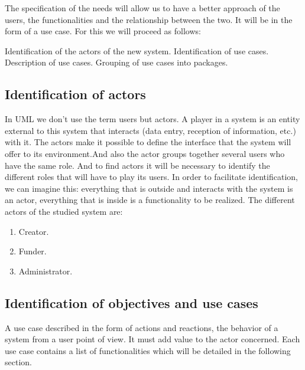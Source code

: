 The specification of the needs will allow us to have a better approach of the users, the functionalities and the relationship between the two. It will be in the form of a use case. For this we will proceed as follows:

Identification of the actors of the new system.
Identification of use cases.
Description of use cases.
Grouping of use cases into packages.

\subsection{Identification of actors}
In UML we don't use the term users but actors. A player in a system is an entity external to this system that interacts (data entry, reception of information, etc.) with it. The actors make it possible to define the interface that the system will offer to its environment.And also the actor groups together several users who have the same role. And to find actors it will be necessary to identify the different roles that will have to play its users.
In order to facilitate identification, we can imagine this: everything that is outside and interacts with the system is an actor, everything that is inside is a functionality to be realized.
The different actors of the studied system are:

\begin{enumerate}
    \item  Creator.
    \item  Funder.
    \item  Administrator.

\end{enumerate}

\subsection{Identification of objectives and use cases}
A use case described in the form of actions and reactions, the behavior of a system from a user point of view. It must add value to the actor concerned. Each use case contains a list of functionalities which will be detailed in the following section.

